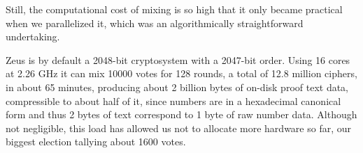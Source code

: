 \documentclass[letterpaper,10pt]{article}
\begin{document}
Still, the computational cost of mixing is so high that
it only became practical when we parallelized it,
which was an algorithmically straightforward undertaking.

Zeus is by default a 2048-bit cryptosystem with a 2047-bit order.
Using 16 cores at 2.26 GHz it can mix 10000 votes for 128 rounds,
a total of 12.8 million ciphers, in about 65 minutes,
producing about 2 billion bytes of on-disk proof text data,
compressible to about half of it,
since numbers are in a hexadecimal canonical form and thus
2 bytes of text correspond to 1 byte of raw number data.
Although not negligible, this load has allowed us
not to allocate more hardware so far,
our biggest election tallying about 1600 votes.

% 
% 

\end{document}
